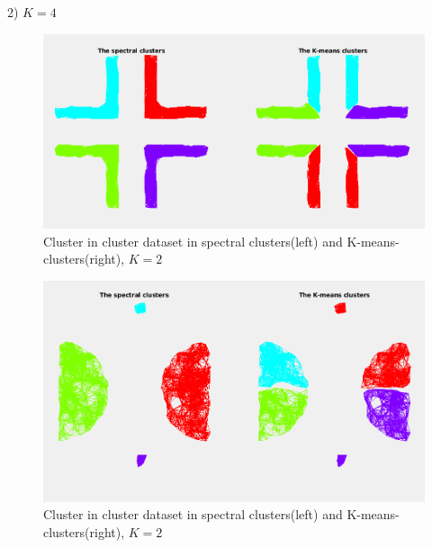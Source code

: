 \documentclass[unicode,11pt,a4paper,oneside,numbers=endperiod,openany]{scrartcl}
\begin{document}
\begin{enumerate}
\newpage

2) ${K=4}$
\begin{figure}[h!]
    \begin{minipage}[c]{1\linewidth}
        \centering
        \includegraphics[width=0.6\linewidth]{./figures/corners4.png}
    \end{minipage}
  \caption{Cluster in cluster dataset in spectral clusters(left) and K-means-clusters(right), ${K=2}$}
\end{figure}

\begin{figure}[h!]
    \begin{minipage}[c]{1\linewidth}
        \centering
        \includegraphics[width=0.6\linewidth]{./figures/outlier4.png}
    \end{minipage}
  \caption{Cluster in cluster dataset in spectral clusters(left) and K-means-clusters(right), ${K=2}$}
\end{figure}

\end{enumerate}


 \newpage
\end{document}

